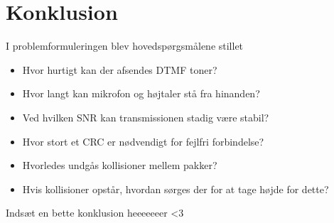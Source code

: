 \section{Konklusion}
I problemformuleringen blev hovedspørgsmålene stillet

\begin{itemize}[noitemsep]
	\item	Hvor hurtigt kan der afsendes DTMF toner?
	\item	Hvor langt kan mikrofon og højtaler stå fra hinanden?
	\item	Ved hvilken SNR kan transmissionen stadig være stabil?
	\item	Hvor stort et CRC er nødvendigt for fejlfri forbindelse?
	\item	Hvorledes undgås kollisioner mellem pakker?
	\item	Hvis kollisioner opstår, hvordan sørges der for at tage højde for dette?
\end{itemize}

Indsæt en bette konklusion heeeeeeer <3